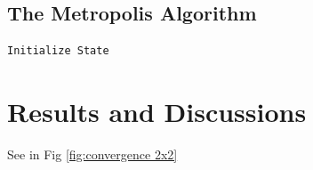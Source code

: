 \documentclass[10pt,showpacs,preprintnumbers,amsmath,amssymb,nofootinbib,aps,prl,twocolumn,groupedaddress,superscriptaddress,showkeys]{revtex4-1}
\begin{document}
  \subsection{The Metropolis Algorithm}

\begin{lstlisting}[mathescape=true, language=python, title=Metropolis Algorithm]
Initialize State 

\end{lstlisting}

\section{Results and Discussions}

  See in Fig \ref{fig:convergence 2x2}

  \begin{figure}[h!t]
    \center
\end{figure}
\end{document}
